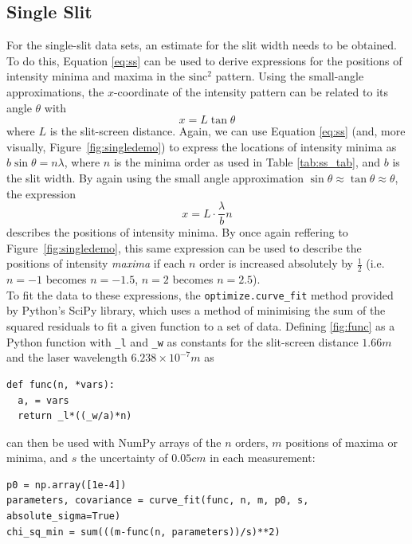 \documentclass[a4paper]{article}
\begin{document}
\subsection{Single Slit} \label{sec:ssan}

For the single-slit data sets, an estimate for the slit width needs to be obtained. To do this, Equation \ref{eq:ss} can be used to derive expressions for the positions of intensity minima and maxima in the $\text{sinc}^2$ pattern. Using the small-angle approximations, the $x$-coordinate of the intensity pattern can be related to its angle $\theta$ with 
\begin{equation} \label{eq:xcoord}
x=L\tan\theta
\end{equation}
where $L$ is the slit-screen distance. Again, we can use Equation \ref{eq:ss} (and, more visually, Figure~\ref{fig:singledemo}) to express the locations of intensity minima as $b\sin\theta=n\lambda$, where $n$ is the minima order as used in Table \ref{tab:ss_tab}, and $b$ is the slit width. By again using the small angle approximation $\sin\theta\approx\tan\theta\approx\theta$, the expression 
\begin{equation} \label{fig:func}
x=L\cdot\frac\lambda{b}n
\end{equation} describes the positions of intensity minima. By once again reffering to Figure~\ref{fig:singledemo}, this same expression can be used to describe the positions of intensity {\it maxima} if each $n$ order is increased absolutely by $\frac12$ (i.e. $n=-1$ becomes $n=-1.5$, $n=2$ becomes $n=2.5$).\\
To fit the data to these expressions, the \lstinline$optimize.curve_fit$ method provided by Python's SciPy library, which uses a method of minimising the sum of the squared residuals to fit a given function to a set of data. Defining \ref{fig:func} as a Python function with \lstinline$_l$ and \lstinline$_w$ as constants for the slit-screen distance $1.66m$ and the laser wavelength $6.238\times10^{-7} m$ as
\begin{lstlisting}[belowskip=-1.5 \baselineskip]
def func(n, *vars):
  a, = vars
  return _l*((_w/a)*n)
\end{lstlisting}
can then be used with NumPy arrays of the $n$ orders, $m$ positions of maxima or minima, and $s$ the uncertainty of $0.05cm$ in each measurement:
\begin{lstlisting}[belowskip=-1.5 \baselineskip]
p0 = np.array([1e-4])
parameters, covariance = curve_fit(func, n, m, p0, s, absolute_sigma=True)
chi_sq_min = sum(((m-func(n, parameters))/s)**2)
\end{lstlisting} 
\end{document}

